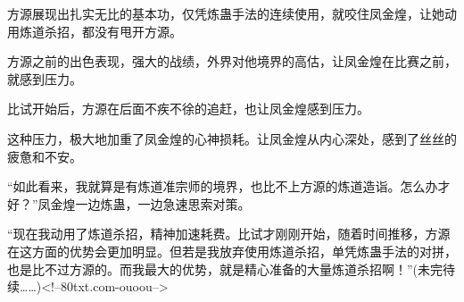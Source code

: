 \begin{this_body}
方源展现出扎实无比的基本功，仅凭炼蛊手法的连续使用，就咬住凤金煌，让她动用炼道杀招，都没有甩开方源。

方源之前的出色表现，强大的战绩，外界对他境界的高估，让凤金煌在比赛之前，就感到压力。

比试开始后，方源在后面不疾不徐的追赶，也让凤金煌感到压力。

这种压力，极大地加重了凤金煌的心神损耗。让凤金煌从内心深处，感到了丝丝的疲惫和不安。

“如此看来，我就算是有炼道准宗师的境界，也比不上方源的炼道造诣。怎么办才好？”凤金煌一边炼蛊，一边急速思索对策。

“现在我动用了炼道杀招，精神加速耗费。比试才刚刚开始，随着时间推移，方源在这方面的优势会更加明显。但若是我放弃使用炼道杀招，单凭炼蛊手法的对拼，也是比不过方源的。而我最大的优势，就是精心准备的大量炼道杀招啊！”(未完待续……)<!--80txt.com-ouoou-->

\end{this_body}

